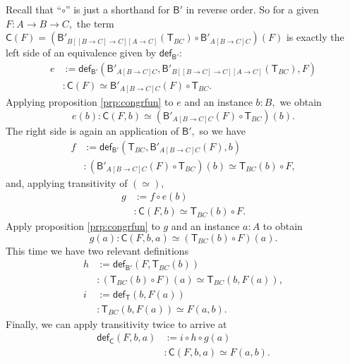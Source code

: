 \documentclass[a4paper]{article}
\theoremstyle{definition}
\theoremstyle{remark}
\renewcommand{\equiv}{\simeq}
\newcommand{\nm}{\mathsf}
\newcommand{\fndef}[1]{\nm{def}_{#1}}
\newcommand{\combinator}{\nm}
\newcommand{\revAppFun}{\combinator{T}}
\newcommand{\compFun}{\combinator{B'}}
\newcommand{\swapFun}{\combinator{C}}
\begin{document}
Recall that ``$\circ$'' is just a shorthand for $\compFun$ in reverse order. So for a given
$F : A \to B \to C,$ the term
$\swapFun(F) = (\compFun_{B[[B{\to}C]{\to}C][A{\to}C]}(\revAppFun_{BC}) \circ \compFun_{A[B{\to}C]C})(F)$
is exactly the left side of an equivalence given by $\fndef{\compFun}$:
\begin{align*}
  e &:= \fndef{\compFun}(\compFun_{A[B{\to}C]C},\compFun_{B[[B{\to}C]{\to}C][A{\to}C]}(\revAppFun_{BC}),F)\\
    &: \swapFun(F) \equiv \compFun_{A[B{\to}C]C}(F) \circ \revAppFun_{BC}.
\end{align*}
Applying proposition \ref{prp:congrfun} to $e$ and an instance $b : B,$ we obtain
\[e(b) : \swapFun(F,b) \equiv (\compFun_{A[B{\to}C]C}(F) \circ \revAppFun_{BC})(b).\]
The right side is again an application of $\compFun,$ so we have
\begin{align*}
  f &:= \fndef{\compFun}(\revAppFun_{BC},\compFun_{A[B{\to}C]C}(F),b)\\
    &: (\compFun_{A[B{\to}C]C}(F) \circ \revAppFun_{BC})(b) \equiv \revAppFun_{BC}(b) \circ F,
\end{align*}
and, applying transitivity of $(\equiv),$
\begin{align*}
  g &:= f \circ e(b)\\
    &: \swapFun(F,b) \equiv \revAppFun_{BC}(b) \circ F.
\end{align*}
Apply proposition \ref{prp:congrfun} to $g$ and an instance $a : A$ to obtain
\[g(a) : \swapFun(F,b,a) \equiv (\revAppFun_{BC}(b) \circ F)(a).\]
This time we have two relevant definitions
\begin{align*}
  h &:= \fndef{\compFun}(F,\revAppFun_{BC}(b))\\
    &: (\revAppFun_{BC}(b) \circ F)(a) \equiv \revAppFun_{BC}(b,F(a)),\\[1ex]
  i &:= \fndef{\revAppFun}(b,F(a))\\
    &: \revAppFun_{BC}(b,F(a)) \equiv F(a,b).
\end{align*}
Finally, we can apply transitivity twice to arrive at
\begin{align*}
  \fndef{\swapFun}(F,b,a) &:= i \circ h \circ g(a)\\
                          &: \swapFun(F,b,a) \equiv F(a,b).
\end{align*}
\end{document}
